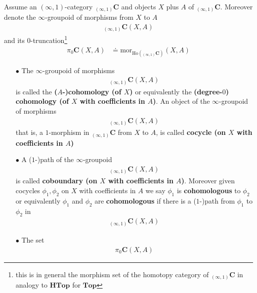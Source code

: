 \\
Assume an $(\infty,1)$-category ${}_{(\infty,1)}\mathbf{C}$ and objects $X$ plus $A$ of ${}_{(\infty,1)}\mathbf{C}$. Moreover denote the $\infty$-groupoid of morphisms from $X$ to $A$
\begin{align*}
  {}_{(\infty,1)}\mathbf{C}
  \left(
    X,
    A
  \right)
\end{align*}
and its $0$-truncation\footnote{this is in general the morphism set of the homotopy category of ${}_{(\infty,1)}\mathbf{C}$ in analogy to $\mathbf{HTop}$ for $\mathbf{Top}$}
\begin{align*}
  \pi_{0}
  \mathbf{C}
  \left(
    X,
    A
  \right)
  &\doteq
  \mathrm{mor}_{\mathrm{Ho}({}_{(\infty,1)}\mathbf{C})}
  \left(
    X,
    A
  \right)
\end{align*}
\begin{enumerate}
\item[$\bullet$]
The $\infty$-groupoid of morphisms
\begin{align*}
  {}_{(\infty,1)}\mathbf{C}
  \left(
    X,
    A
  \right)
\end{align*}
is called the \textbf{($A$-)cohomology (of $X$)} or equivalently the \textbf{(degree-$0$) cohomology (of $X$ with coefficients in $A$)}. An object of the $\infty$-groupoid of morphisms
\begin{align*}
  {}_{(\infty,1)}\mathbf{C}
  \left(
    X,
    A
  \right)
\end{align*}
that is, a $1$-morphism in ${}_{(\infty,1)}\mathbf{C}$ from $X$ to $A$, is called \textbf{cocycle (on $X$ with coefficients in $A$)}
\item[$\bullet$]
A ($1$-)path of the $\infty$-groupoid
\begin{align*}
  {}_{(\infty,1)}\mathbf{C}
  \left(
    X,
    A
  \right)
\end{align*}
is called \textbf{coboundary (on $X$ with coefficients in $A$)}. Moreover given cocycles $\phi_{1},\phi_{2}$ on $X$ with coefficients in $A$ we say $\phi_{1}$ is \textbf{cohomologous} to $\phi_{2}$ or equivalently $\phi_{1}$ and $\phi_{2}$ are \textbf{cohomologous} if there is a ($1$-)path from $\phi_{1}$ to $\phi_{2}$ in
\begin{align*}
  {}_{(\infty,1)}\mathbf{C}
  \left(
    X,
    A
  \right)
\end{align*}
\item[$\bullet$]
The set
\begin{align*}
  \pi_{0}
  \mathbf{C}
  \left(
    X,
    A
  \right)
\end{align*}

\end{enumerate}
